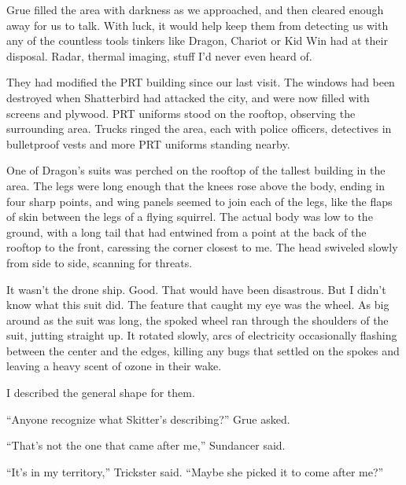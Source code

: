 \sectionbreak



Grue filled the area with darkness as we approached, and then cleared enough away for us to talk.  With luck, it would help keep them from detecting us with any of the countless tools tinkers like Dragon, Chariot or Kid Win had at their disposal.  Radar, thermal imaging, stuff I'd never even heard of.



They had modified the PRT building since our last visit.  The windows had been destroyed when Shatterbird had attacked the city, and were now filled with screens and plywood.  PRT uniforms stood on the rooftop, observing the surrounding area.  Trucks ringed the area, each with police officers, detectives in bulletproof vests and more PRT uniforms standing nearby.



One of Dragon's suits was perched on the rooftop of the tallest building in the area.  The legs were long enough that the knees rose above the body, ending in four sharp points, and wing panels seemed to join each of the legs, like the flaps of skin between the legs of a flying squirrel.  The actual body was low to the ground, with a long tail that had entwined from a point at the back of the rooftop to the front, caressing the corner closest to me.  The head swiveled slowly from side to side, scanning for threats.



It wasn't the drone ship.  Good.  That would have been disastrous.  But I didn't know what this suit did.  The feature that caught my eye was the wheel.  As big around as the suit was long, the spoked wheel ran through the shoulders of the suit, jutting straight up.  It rotated slowly, arcs of electricity occasionally flashing between the center and the edges, killing any bugs that settled on the spokes and leaving a heavy scent of ozone in their wake.



I described the general shape for them.



``Anyone recognize what Skitter's describing?'' Grue asked.



``That's not the one that came after me,'' Sundancer said.



``It's in my territory,'' Trickster said.  ``Maybe she picked it to come after me?''



